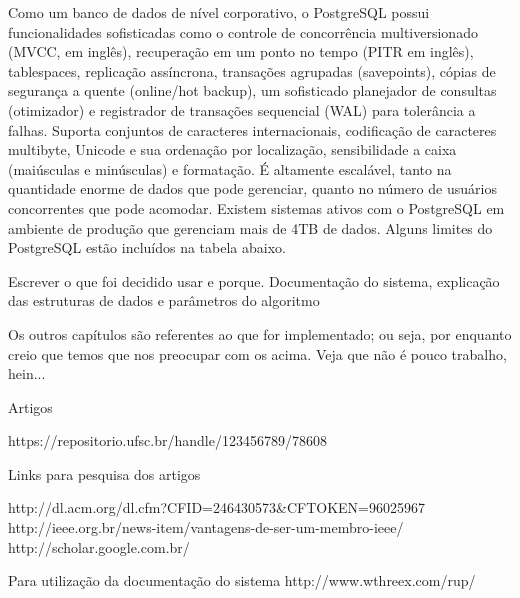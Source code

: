 \documentclass{article}
\begin{document}
Como um banco de dados de nível corporativo, o PostgreSQL  possui funcionalidades sofisticadas como o controle de concorrência multiversionado (MVCC, em inglês), recuperação em um ponto no tempo (PITR em inglês), tablespaces, replicação assíncrona, transações agrupadas (savepoints), cópias de segurança a quente (online/hot backup), um sofisticado planejador de consultas (otimizador) e registrador de transações sequencial (WAL) para tolerância a falhas.  Suporta conjuntos de caracteres internacionais, codificação de caracteres multibyte, Unicode e sua ordenação por localização, sensibilidade a caixa (maiúsculas e minúsculas) e formatação.  É altamente escalável, tanto na quantidade enorme de dados que pode gerenciar, quanto no número de usuários concorrentes que pode acomodar. Existem sistemas ativos com o PostgreSQL em ambiente de produção que gerenciam mais de 4TB de dados.  Alguns limites do PostgreSQL estão incluídos na tabela abaixo.


Escrever o que foi decidido usar e porque. Documentação do sistema,
explicação das estruturas de dados e parâmetros do algoritmo


Os outros capítulos são referentes ao que for implementado; ou seja,
por enquanto creio que temos que nos preocupar com os acima. Veja que
não é pouco trabalho, hein...




Artigos

https://repositorio.ufsc.br/handle/123456789/78608



Links para pesquisa dos artigos

http://dl.acm.org/dl.cfm?CFID=246430573&CFTOKEN=96025967
http://ieee.org.br/news-item/vantagens-de-ser-um-membro-ieee/
http://scholar.google.com.br/

Para utilização da documentação do sistema
http://www.wthreex.com/rup/
\end{document}
